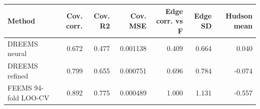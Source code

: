 \begin{tabular}{lrrrrrr}
\toprule
Method & Cov. corr. & Cov. R2 & Cov. MSE & Edge corr. vs F & Edge SD & Hudson mean \\
\midrule
DREEMS neural & 0.672 & 0.477 & 0.001138 & 0.409 & 0.664 & 0.040 \\
DREEMS refined & 0.799 & 0.655 & 0.000751 & 0.696 & 0.784 & -0.074 \\
FEEMS 94-fold LOO-CV & 0.892 & 0.775 & 0.000489 & 1.000 & 1.131 & -0.557 \\
\bottomrule
\end{tabular}
